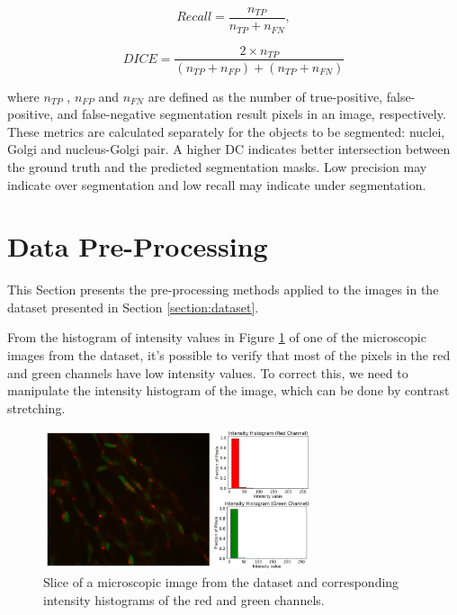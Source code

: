\begin{equation}
    Recall = \frac{n_{TP}}{n_{TP}+n_{FN}},
\end{equation}

\begin{equation}
 DICE =\frac{2 \times n_{TP}}{(n_{TP}+n_{FP})+(n_{TP}+n_{FN})}
\end{equation}

\noindent where $n_{TP}$ , $n_{FP}$ and $n_{FN}$ are defined as the number of true-positive, false-positive, and false-negative segmentation result pixels in an image, respectively. These metrics are calculated separately for the objects to be segmented: nuclei, Golgi and nucleus-Golgi pair. A higher \ac{DC} indicates better intersection between the ground truth and the predicted segmentation masks. Low precision may indicate over segmentation and low recall may indicate under segmentation.

\section{Data Pre-Processing}
\label{section:pre}
This Section presents the pre-processing methods applied to the images in the dataset presented in Section \ref{section:dataset}.

From the histogram of intensity values in Figure \ref{fig:micro} of one of the microscopic images from the dataset, it's possible to verify that most of the pixels in the red and green channels have low intensity values. To correct this, we need to manipulate the intensity histogram of the image, which can be done by contrast stretching.

\begin{figure}[!htb]
  \centering
  \includegraphics[width=0.70\textwidth]{Images/img.jpg}
  \caption{Slice of a microscopic image from the dataset and corresponding intensity histograms of the red and green channels.}
  \label{fig:micro}
\end{figure}


